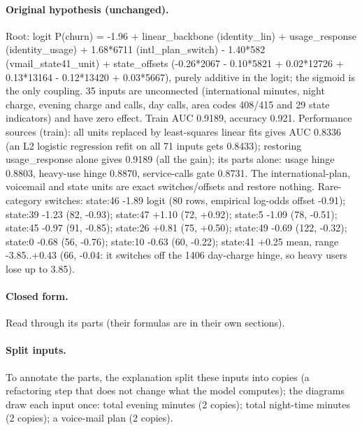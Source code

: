 \documentclass[a4paper,10pt]{article}
\newif\ifreviewmarks
\newcommand{\reviewrule}{\noindent{\color{BrickRed}\rule{\linewidth}{0.8pt}}}
\newenvironment{drafted}[1][]{%
  \ifreviewmarks\par\addvspace{\medskipamount}\reviewrule\par\nopagebreak
  \noindent{\color{BrickRed}\sffamily\footnotesize\textbf{Thesis Draft}\quad #1\hfill review}\par\nopagebreak\smallskip\fi}{%
  \ifreviewmarks\par\smallskip\noindent{\color{BrickRed}\sffamily\footnotesize end of thesis draft}\par\nopagebreak\reviewrule\par\medskip\fi}
\begin{document}
\begin{drafted}[plain-language layer: churn100-s7-c1]
\paragraph{Original hypothesis (unchanged).} Root: logit P(churn) = -1.96 + linear\_\allowbreak{}backbone (identity\_\allowbreak{}lin) + usage\_\allowbreak{}response (identity\_\allowbreak{}usage) + 1.68*6711 (intl\_\allowbreak{}plan\_\allowbreak{}switch) - 1.40*582 (vmail\_\allowbreak{}state41\_\allowbreak{}unit) + state\_\allowbreak{}offsets (-0.26*2067 - 0.10*5821 + 0.02*12726 + 0.13*13164 - 0.12*13420 + 0.03*5667), purely additive in the logit; the sigmoid is the only coupling. 35 inputs are unconnected (international minutes, night charge, evening charge and calls, day calls, area codes 408/415 and 29 state indicators) and have zero effect. Train AUC 0.9189, accuracy 0.921. Performance sources (train): all units replaced by least-squares linear fits gives AUC 0.8336 (an L2 logistic regression refit on all 71 inputs gets 0.8433); restoring usage\_\allowbreak{}response alone gives 0.9189 (all the gain); its parts alone: usage hinge 0.8803, heavy-use hinge 0.8870, service-calls gate 0.8731. The international-plan, voicemail and state units are exact switches/offsets and restore nothing. Rare-category switches: state:46 -1.89 logit (80 rows, empirical log-odds offset -0.91); state:39 -1.23 (82, -0.93); state:47 +1.10 (72, +0.92); state:5 -1.09 (78, -0.51); state:45 -0.97 (91, -0.85); state:26 +0.81 (75, +0.50); state:49 -0.69 (122, -0.32); state:0 -0.68 (56, -0.76); state:10 -0.63 (60, -0.22); state:41 +0.25 mean, range -3.85..+0.43 (66, -0.04: it switches off the 1406 day-charge hinge, so heavy users lose up to 3.85).
\paragraph{Closed form.} Read through its parts (their formulas are in their own sections).
\paragraph{Split inputs.} To annotate the parts, the explanation split these inputs into copies (a refactoring step that does not change what the model computes); the diagrams draw each input once: total evening minutes (2 copies); total night-time minutes (2 copies); a voice-mail plan (2 copies).

\end{drafted}
\end{document}
